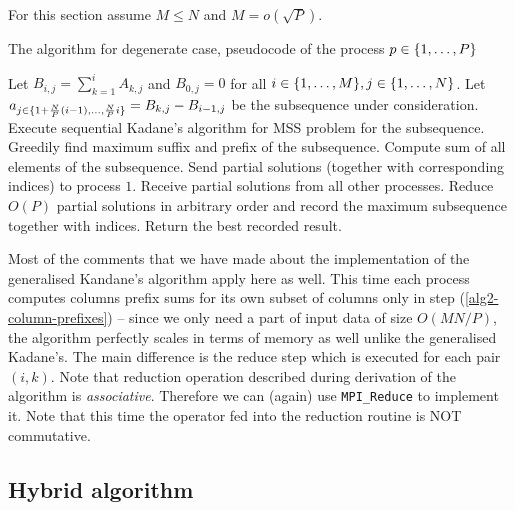 For this section assume $M \leq N$ and $M = o(\sqrt{P})$.

\begin{algorithm}[h!]
    \caption{The algorithm for degenerate case, pseudocode of the process $p \in \{ 1, \dots, P \}$}
    \begin{algorithmic}[1]
        \State Let $B_{i, j} = \sum_{k = 1}^{i}{A_{k, j}}$ and $B_{0, j} = 0$ for all $i \in \{ 1, \dots, M \}, j \in \{ 1, \dots, N \}$. \label{alg2-column-prefixes}
                \State Let $a_{j \in \{ 1 + \frac{N}{P} (i - 1), \dots, \frac{N}{P} i \}} = B_{k, j} - B_{i-1, j}$ be the subsequence under consideration.
                \State Execute sequential Kadane's algorithm for MSS problem for the subsequence.
                \State Greedily find maximum suffix and prefix of the subsequence.
                \State Compute sum of all elements of the subsequence.
                    \State Send partial solutions (together with corresponding indices) to process $1$.
                \Else
                    \State Receive partial solutions from all other processes.
                    \State Reduce $O(P)$ partial solutions in arbitrary order and record the maximum subsequence together with indices.
                \EndIf
            \EndFor
        \EndFor
            \State Return the best recorded result.
        \EndIf
    \end{algorithmic}
\end{algorithm}

Most of the comments that we have made about the implementation of the generalised Kandane's algorithm apply here as well.
This time each process computes columns prefix sums for its own subset of columns only in step (\ref{alg2-column-prefixes}) -- since we only need a part of input data of size $O(MN / P)$, the algorithm perfectly scales in terms of memory as well unlike the generalised Kadane's.
The main difference is the reduce step which is executed for each pair $(i, k)$.
Note that reduction operation described during derivation of the algorithm is \emph{associative}.
Therefore we can (again) use \verb+MPI_Reduce+ to implement it.
Note that this time the operator fed into the reduction routine is NOT commutative.

\subsection*{Hybrid algorithm}

